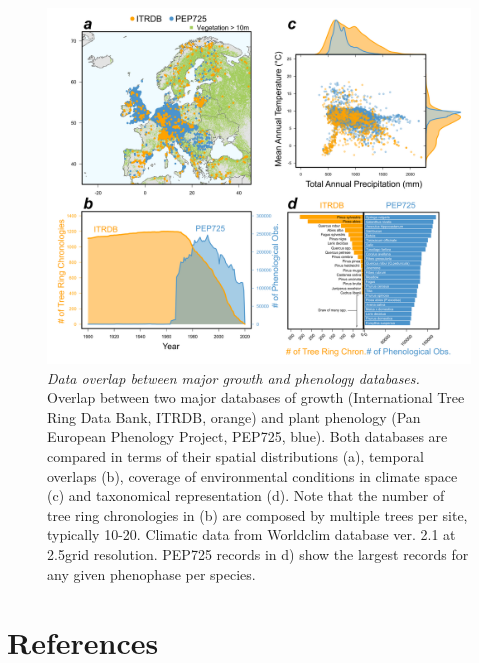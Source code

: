 \documentclass[11pt]{article}
\begin{document}
\clearpage
\begin{figure}[h!]
\includegraphics[width=1\textwidth]{..//figures/_figuresFromRuben/itrdb_vs_pep.png} %
\caption{\emph{Data overlap between major growth and phenology databases.} Overlap between two major databases of growth (International Tree Ring Data Bank, ITRDB, orange) and plant phenology (Pan European Phenology Project, PEP725, blue). Both databases are compared in terms of their spatial distributions (a), temporal overlaps (b), coverage of environmental conditions in climate space (c) and taxonomical representation (d). Note that the number of tree ring chronologies in (b) are composed by multiple trees per site, typically 10-20. Climatic data from Worldclim database ver. 2.1 at 2.5\degree grid resolution. PEP725 records in d) show the largest records for any given phenophase per species.}
\label{fig:itrbdpep}
\end{figure}


\clearpage
\section*{References}


\end{document}

